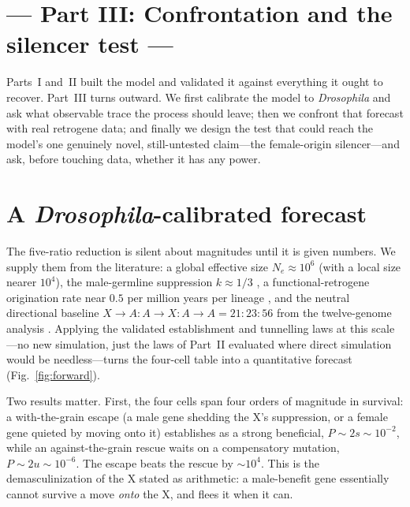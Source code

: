 \documentclass[11pt,a4paper]{article}
\begin{document}
\section*{\centering --- Part III: Confrontation and the silencer test ---}

Parts~I and~II built the model and validated it against everything it ought to recover. Part~III turns outward. We first calibrate the model to \emph{Drosophila} and ask what observable trace the process should leave; then we confront that forecast with real retrogene data; and finally we design the test that could reach the model's one genuinely novel, still-untested claim---the female-origin silencer---and ask, before touching data, whether it has any power.

\section{A \emph{Drosophila}-calibrated forecast}

The five-ratio reduction is silent about magnitudes until it is given numbers. We supply them from the literature: a global effective size $N_e\approx 10^6$ (with a local size nearer $10^4$), the male-germline suppression $k\approx 1/3$ \citep{landeen2016}, a functional-retrogene origination rate near $0.5$ per million years per lineage \citep{bai2007}, and the neutral directional baseline $X{\to}A:A{\to}X:A{\to}A = 21:23:56$ from the twelve-genome analysis \citep{vibranovski2009}. Applying the validated establishment and tunnelling laws at this scale---no new simulation, just the laws of Part~II evaluated where direct simulation would be needless---turns the four-cell table into a quantitative forecast (Fig.~\ref{fig:forward}).

Two results matter. First, the four cells span four orders of magnitude in survival: a with-the-grain escape (a male gene shedding the X's suppression, or a female gene quieted by moving onto it) establishes as a strong beneficial, $P\sim 2s\sim 10^{-2}$, while an against-the-grain rescue waits on a compensatory mutation, $P\sim 2u\sim 10^{-6}$. The escape beats the rescue by $\sim\!10^4$. This is the demasculinization of the X stated as arithmetic: a male-benefit gene essentially cannot survive a move \emph{onto} the X, and flees it when it can.
\end{document}
